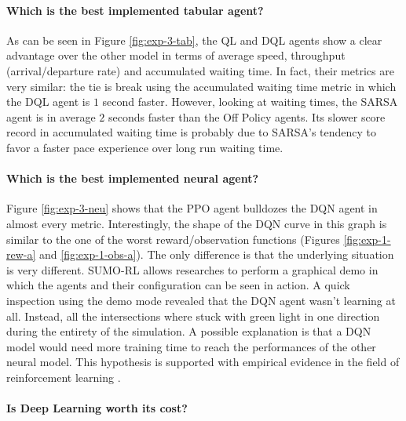 \paragraph{Which is the best implemented tabular agent?}

As can be seen in Figure \ref{fig:exp-3-tab}, the QL and DQL agents show a clear advantage over the other model in terms of average speed, throughput (arrival/departure rate) and accumulated waiting time.
In fact, their metrics are very similar: the tie is break using the accumulated waiting time metric in which the DQL agent is $1$ second faster.
However, looking at waiting times, the SARSA agent is in average $2$ seconds faster than the Off Policy agents.
Its slower score record in accumulated waiting time is probably due to SARSA's tendency to favor a faster pace experience over long run waiting time.


\paragraph{Which is the best implemented neural agent?}

Figure \ref{fig:exp-3-neu} shows that the PPO agent bulldozes the DQN agent in almost every metric.
Interestingly, the shape of the DQN curve in this graph is similar to the one of the worst reward/observation functions (Figures \ref{fig:exp-1-rew-a} and \ref{fig:exp-1-obs-a}).
The only difference is that the underlying situation is very different.
SUMO-RL allows researches to perform a graphical demo in which the agents and their configuration can be seen in action.
A quick inspection using the demo mode revealed that the DQN agent wasn't learning at all.
Instead, all the intersections where stuck with green light in one direction during the entirety of the simulation.
A possible explanation is that a DQN model would need more training time to reach the performances of the other neural model.
This hypothesis is supported with empirical evidence in the field of reinforcement learning \cite{kozlica2023deep}.


\paragraph{Is Deep Learning worth its cost?}

